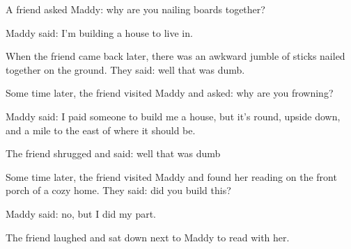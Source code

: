 A friend asked Maddy: why are you nailing boards together?

Maddy said: I'm building a house to live in.

When the friend came back later, there was an awkward jumble of sticks nailed together on the ground. They said: well that was dumb.

Some time later, the friend visited Maddy and asked: why are you frowning?

Maddy said: I paid someone to build me a house, but it's round, upside down, and a mile to the east of where it should be.

The friend shrugged and said: well that was dumb

Some time later, the friend visited Maddy and found her reading on the front porch of a cozy home. They said: did you build this?

Maddy said: no, but I did my part.

The friend laughed and sat down next to Maddy to read with her.
